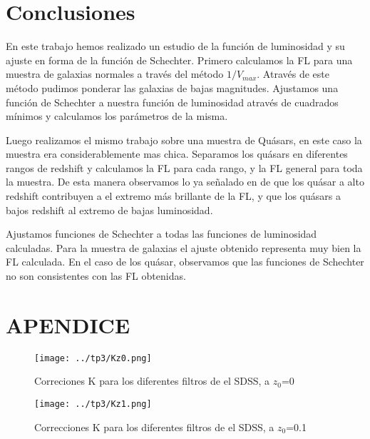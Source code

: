 \documentclass[a4paper,10pt]{article}
\begin{document}
 
\section{Conclusiones}

En este trabajo hemos realizado un estudio de la funci\'on de luminosidad y su ajuste en forma de la funci\'on de Schechter. Primero calculamos la FL para una muestra de galaxias normales a trav\'es del m\'etodo $1/V_{max}$. Atrav\'es de este m\'etodo pudimos ponderar las galaxias de bajas magnitudes. Ajustamos una funci\'on de Schechter a nuestra funci\'on de luminosidad atrav\'es de cuadrados m\'inimos y calculamos los par\'ametros de la misma. 

Luego realizamos el mismo trabajo sobre una muestra de Qu\'asars, en este caso la muestra era considerablemente mas chica.  Separamos los qu\'asars en diferentes rangos de redshift y calculamos la FL para cada rango, y la FL general para toda la muestra. De esta manera observamos lo ya se\~nalado en \citet{Croom2009} de que los qu\'asar a alto redshift contribuyen a el extremo m\'as brillante de la FL, y que los qu\'asars a bajos redshift al extremo de bajas luminosidad.

Ajustamos funciones de Schechter a todas las funciones de luminosidad calculadas. Para la muestra de galaxias el ajuste obtenido representa muy bien la FL calculada. En el caso de los qu\'asar, observamos que las funciones de Schechter no son consistentes con las FL obtenidas. 











\section{APENDICE}
\begin{figure}[H]
 \centering
 \texttt{[image: ../tp3/Kz0.png]}
 \caption{Correciones K para los diferentes filtros de el SDSS, a $z_{0}$=0 }
 \label{fig:1}
\end{figure}
\begin{figure}[H]
 \centering
 \texttt{[image: ../tp3/Kz1.png]}
 \caption{Correcciones K para los diferentes filtros de el SDSS, a $z_{0}$=0.1}
\end{figure}
\end{document}
